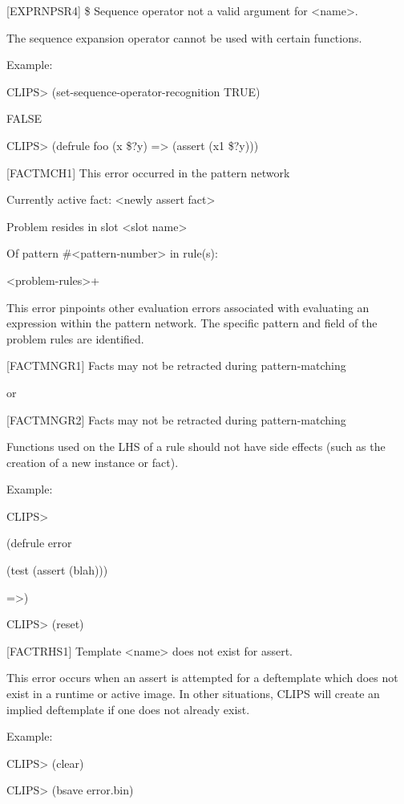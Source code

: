 \documentclass[letterpaper,10pt,english]{sphinxmanual}
\begin{document}
{[}EXPRNPSR4{]} \$ Sequence operator not a valid argument for \textless{}name\textgreater{}.

The sequence expansion operator cannot be used with certain functions.

Example:

CLIPS\textgreater{} (set-sequence-operator-recognition TRUE)

FALSE

CLIPS\textgreater{} (defrule foo (x \$?y) =\textgreater{} (assert (x1 \$?y)))

{[}FACTMCH1{]} This error occurred in the pattern network

Currently active fact: \textless{}newly assert fact\textgreater{}

Problem resides in slot \textless{}slot name\textgreater{}

Of pattern \#\textless{}pattern-number\textgreater{} in rule(s):

\textless{}problem-rules\textgreater{}+

This error pinpoints other evaluation errors associated with evaluating
an expression within the pattern network. The specific pattern and field
of the problem rules are identified.

{[}FACTMNGR1{]} Facts may not be retracted during pattern-matching

or

{[}FACTMNGR2{]} Facts may not be retracted during pattern-matching

Functions used on the LHS of a rule should not have side effects (such
as the creation of a new instance or fact).

Example:

CLIPS\textgreater{}

(defrule error

(test (assert (blah)))

=\textgreater{})

CLIPS\textgreater{} (reset)

{[}FACTRHS1{]} Template \textless{}name\textgreater{} does not exist for assert.

This error occurs when an assert is attempted for a deftemplate which
does not exist in a runtime or active  image. In other
situations, CLIPS will create an implied deftemplate if one does not
already exist.

Example:

CLIPS\textgreater{} (clear)

CLIPS\textgreater{} (bsave error.bin)
\end{document}
